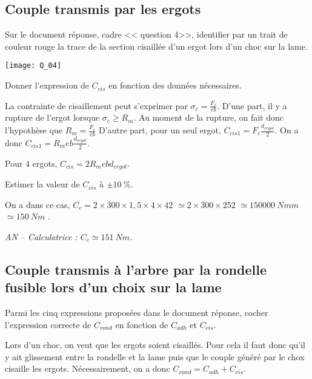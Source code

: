 \documentclass[11pt]{article}
\begin{document}
\subsection{Couple transmis par les ergots}

\UPSTIquestion* Sur le document réponse, cadre << question  4>>, identifier par un trait de couleur rouge la trace de la section cisaillée d'un ergot lors d'un choc sur la lame.

\begin{UPSTIcorrige}

\begin{center}
\texttt{[image: Q\_04]}
\end{center}
\end{UPSTIcorrige}

\UPSTIquestion Donner l'expression de $C_{cis}$ en fonction des données nécessaires. 

\begin{UPSTIcorrige}
La contrainte de cisaillement peut s'exprimer par $\sigma_c = \frac{F_c}{eb}$.
D'une part, il y a rupture de l'ergot lorsque $\sigma_c \geq R_m$. Au moment de la rupture, on fait donc l'hypothèse que
$R_m = \frac{F_c}{eb}$
D'autre part, pour un seul ergot, $C_{cis1} = F_c \frac{d_{ergot}}{2}$.
On a donc $C_{cis1} = R_m e b \frac{d_{ergot}}{2}$. 

Pour 4 ergots, $C_{cis} = 2R_m e b d_{ergot}$. 
\end{UPSTIcorrige}

\UPSTIquestion Estimer la valeur de $C_{cis}$ à  $\pm\SI{10}{\%}$.

\begin{UPSTIcorrige}
On a dans ce cas, $C_c = 2 \times 300 \times 1,5 \times  4 \times 42$
$ \simeq 2 \times 300 \times 252$ $ \simeq \SI{150000}{Nmm}$ $\simeq \SI{150}{Nm}$ .

\textit{AN -- Calculatrice : $C_{c}\simeq \SI{151}{Nm}$.}
\end{UPSTIcorrige}

\subsection{Couple transmis à l'arbre par la rondelle fusible lors d'un choix sur la lame}
\UPSTIquestion* Parmi les cinq expressions proposées dans le document réponse, cocher l'expression correcte de $C_{rond}$ en fonction de 
$C_{adh}$ et $C_{cis}$.

\begin{UPSTIcorrige}
Lors d'un choc, on veut que les ergots soient cisaillés. Pour cela il faut donc qu'il y ait glissement entre la rondelle et la lame puis que le couple généré par le chox cisaille les ergots. 
Nécessairement, on a donc $C_{rond}=C_{adh} + C_{cis}$.
\end{UPSTIcorrige}
\end{document}
